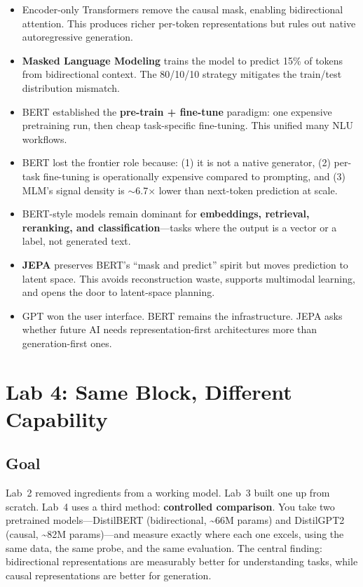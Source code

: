 \begin{takeaways}
\begin{itemize}[leftmargin=1.2em, itemsep=4pt]
  \item Encoder-only Transformers remove the causal mask, enabling bidirectional attention. This produces richer per-token representations but rules out native autoregressive generation.
  \item \textbf{Masked Language Modeling} trains the model to predict 15\% of tokens from bidirectional context. The 80/10/10 strategy mitigates the train/test distribution mismatch.
  \item BERT established the \textbf{pre-train + fine-tune} paradigm: one expensive pretraining run, then cheap task-specific fine-tuning. This unified many NLU workflows.
  \item BERT lost the frontier role because: (1) it is not a native generator, (2) per-task fine-tuning is operationally expensive compared to prompting, and (3) MLM's signal density is $\sim$6.7$\times$ lower than next-token prediction at scale.
  \item BERT-style models remain dominant for \textbf{embeddings, retrieval, reranking, and classification}---tasks where the output is a vector or a label, not generated text.
  \item \textbf{JEPA} preserves BERT's ``mask and predict'' spirit but moves prediction to latent space. This avoids reconstruction waste, supports multimodal learning, and opens the door to latent-space planning.
  \item GPT won the user interface. BERT remains the infrastructure. JEPA asks whether future AI needs representation-first architectures more than generation-first ones.
\end{itemize}
\end{takeaways}


\section*{Lab 4: Same Block, Different Capability}

\subsection*{Goal}

Lab~2 removed ingredients from a working model. Lab~3 built one up from scratch. Lab~4 uses a third method: \textbf{controlled comparison}. You take two pretrained models---DistilBERT (bidirectional, \textasciitilde66M params) and DistilGPT2 (causal, \textasciitilde82M params)---and measure exactly where each one excels, using the same data, the same probe, and the same evaluation. The central finding: bidirectional representations are measurably better for understanding tasks, while causal representations are better for generation.

